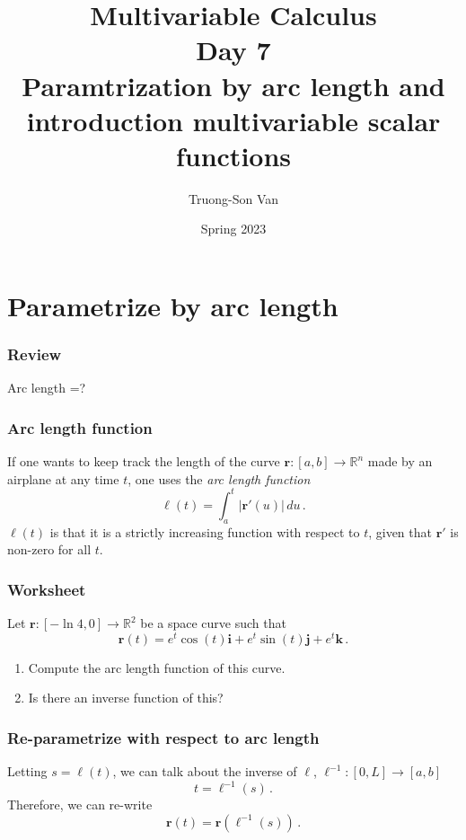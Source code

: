 \documentclass[aspectratio=169,handout]{beamer}
\title{ Multivariable Calculus \\ Day 7 \\ Paramtrization by arc length and introduction multivariable scalar functions}
\institute{Fulbright University Vietnam}
\author{Truong-Son Van}
\date{Spring 2023}
\newcommand{\vect}{\mathbf}
\newcommand{\R}{\mathbb{R}}
\begin{document}
\maketitle

\section{Parametrize by arc length}
\begin{frame}
    \frametitle{Review}

    Arc length =?
\end{frame}

\begin{frame}
    \frametitle{Arc length function}

If one wants to keep track the length of the curve  $\vect{r}:[a,b] \to \R^n$ made by an airplane
at any time $t$, one uses the \emph{arc length function}
\begin{equation*}
    \ell(t) = \int_a^t \left| \vect{r}'(u) \right| \, du \,.
\end{equation*}
\pause
$\ell(t)$ is that it is a strictly increasing function with respect to $t$,
given that $\vect{r}'$ is non-zero for all $t$.
\end{frame}

\begin{frame}
    \frametitle{Worksheet}
    Let $\vect{r}:[-\ln 4,0] \to \R^2$ be a space curve such that
    \begin{equation*}
        \vect{r}(t) = e^t \cos(t) \vect{i} + e^t \sin(t) \vect{j} + e^t \vect{k} \,.
    \end{equation*}
    \begin{enumerate}
        \item Compute the arc length function of this curve.
        \item Is there an inverse function of this?
    \end{enumerate}
\end{frame}

\begin{frame}
    \frametitle{ Re-parametrize with respect to arc length}
    Letting $s = \ell(t)$, we can talk about the inverse of $\ell$, $\ell^{-1}:[0,L] \to [a,b]$
    \begin{equation*}
        t = \ell^{-1}(s) \,.
    \end{equation*}
    \pause
    Therefore, we can re-write
    \begin{equation*}
    \vect{r}(t) = \vect{r}(\ell^{-1}(s)) \,.
    \end{equation*}
\end{frame}
\end{document}
